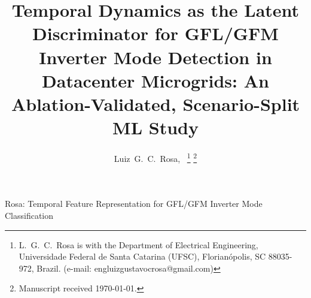 \documentclass[journal]{IEEEtran}
\begin{document}
\title{Temporal Dynamics as the Latent Discriminator for GFL/GFM
       Inverter Mode Detection in Datacenter Microgrids:
       An Ablation-Validated, Scenario-Split ML Study}

\author{
  Luiz~G.~C.~Rosa,~
  \thanks{L.~G.~C.~Rosa is with the Department of Electrical
    Engineering, Universidade Federal de Santa Catarina (UFSC),
    Florianópolis, SC 88035-972, Brazil.
    (e-mail: engluizgustavocrosa@gmail.com)}
  \thanks{Manuscript received \today.}
}

         {Rosa: Temporal Feature Representation for GFL/GFM Inverter Mode Classification}

\maketitle
\end{document}
